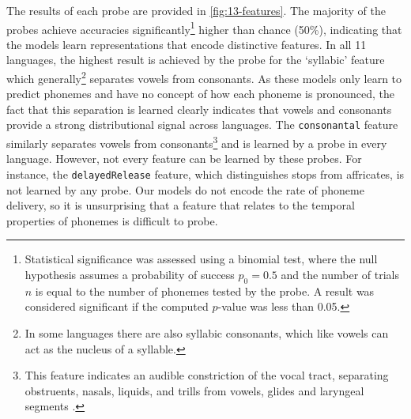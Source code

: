 The results of each probe are provided in \cref{fig:13-features}. The majority of the probes achieve accuracies significantly\footnote{Statistical significance was assessed using a binomial test, where the null hypothesis assumes a probability of success \( p_0 = 0.5 \) and the number of trials \( n \) is equal to the number of phonemes tested by the probe. A result was considered significant if the computed \( p \)-value was less than 0.05.} higher than chance (50\%), indicating that the models learn representations that encode distinctive features. %
In all 11 languages, the highest result is achieved by the probe for the `syllabic' feature which generally\footnote{In some languages there are also syllabic consonants, which like vowels can act as the nucleus of a syllable.} separates vowels from consonants. As these models only learn to predict phonemes and have no concept of how each phoneme is pronounced, the fact that this separation is learned clearly indicates that vowels and consonants provide a strong distributional signal across languages. The \texttt{consonantal} feature similarly separates vowels from consonants\footnote{This feature indicates an audible constriction of the vocal tract, separating obstruents, nasals, liquids, and trills from vowels, glides and laryngeal segments \citep{gussenhoven2017understanding}.} and is learned by a probe in every language. However, not every feature can be learned by these probes. For instance, the \texttt{delayedRelease} feature, which distinguishes stops from affricates, is not learned by any probe. Our models do not encode the rate of phoneme delivery, so it is unsurprising that a feature that relates to the temporal properties of phonemes is difficult to probe.

